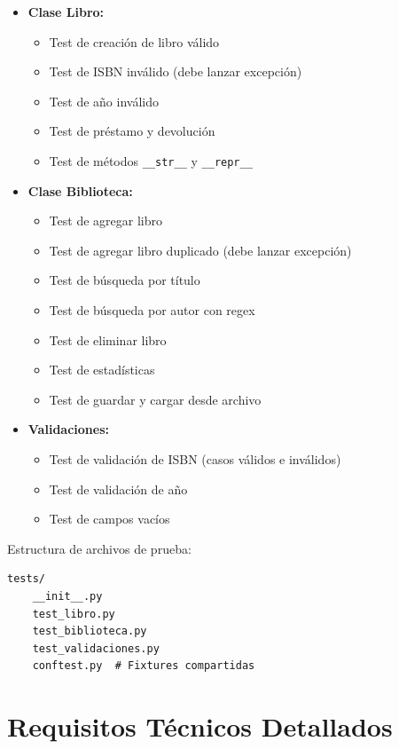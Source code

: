 \documentclass[12pt,a4paper]{article}
\begin{document}
\begin{itemize}[leftmargin=*]
    \item \textbf{Clase Libro:}
    \begin{itemize}
        \item Test de creación de libro válido
        \item Test de ISBN inválido (debe lanzar excepción)
        \item Test de año inválido
        \item Test de préstamo y devolución
        \item Test de métodos \texttt{\_\_str\_\_} y \texttt{\_\_repr\_\_}
    \end{itemize}
    
    \item \textbf{Clase Biblioteca:}
    \begin{itemize}
        \item Test de agregar libro
        \item Test de agregar libro duplicado (debe lanzar excepción)
        \item Test de búsqueda por título
        \item Test de búsqueda por autor con regex
        \item Test de eliminar libro
        \item Test de estadísticas
        \item Test de guardar y cargar desde archivo
    \end{itemize}
    
    \item \textbf{Validaciones:}
    \begin{itemize}
        \item Test de validación de ISBN (casos válidos e inválidos)
        \item Test de validación de año
        \item Test de campos vacíos
    \end{itemize}
\end{itemize}

Estructura de archivos de prueba:
\begin{lstlisting}[caption=Estructura de pruebas]
tests/
    __init__.py
    test_libro.py
    test_biblioteca.py
    test_validaciones.py
    conftest.py  # Fixtures compartidas
\end{lstlisting}

\section{Requisitos Técnicos Detallados}
\end{document}
